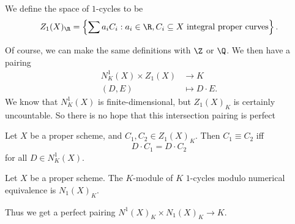 \documentclass[a4paper]{article}
\begin{document}
\begin{defi}[1-cycles]
  We define the space of $1$-cycles to be
  \[
    Z_1(X)_\R = \left\{\sum a_i C_i : a_i \in \R, C_i \subseteq X\text{ integral proper curves}\right\}.
  \]
\end{defi}
Of course, we can make the same definitions with $\Z$ or $\Q$. We then have a pairing
\begin{align*}
  N^1_K(X) \times Z_1(X) &\to K\\
  (D, E) &\mapsto D \cdot E.
\end{align*}
We know that $N^1_K(X)$ is finite-dimensional, but $Z_1(X)_K$ is certainly uncountable. So there is no hope that this intersection pairing is perfect
\begin{defi}\index{$\equiv$}
  Let $X$ be a proper scheme, and $C_1, C_2 \in Z_1(X)_K$. Then $C_1 \equiv C_2$ iff
  \[
    D \cdot C_1 = D \cdot C_2
  \]
  for all $D \in N^1_K(X)$.
\end{defi}

\begin{defi}[$N_1(X)_K$]
  Let $X$ be a proper scheme. The $K$-module of $K$ $1$-cycles modulo numerical equivalence is $N_1(X)_K$.
\end{defi}
Thus we get a perfect pairing $N^1(X)_K \times N_1(X)_K \to K$.

\printindex
\end{document}
